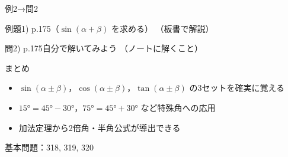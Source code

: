 \documentclass[aspectratio=43,professionalfonts,handout]{beamer}
\begin{document}
\begin{frame}{例2→問2}
  \begin{exampleblock}{例題1) p.175（$\sin(\alpha+\beta)$ を求める）}
    （板書で解説）
  \end{exampleblock}

  \vfill

  \begin{block}{問2) p.175\quad 自分で解いてみよう}
    （ノートに解くこと）
  \end{block}
\end{frame}

\begin{frame}{まとめ}
  \begin{itemize}
    \item $\sin(\alpha\pm\beta)$，$\cos(\alpha\pm\beta)$，$\tan(\alpha\pm\beta)$ の3セットを確実に覚える
    \item $15° = 45° - 30°$，$75° = 45° + 30°$ など特殊角への応用
    \item 加法定理から2倍角・半角公式が導出できる
  \end{itemize}

  \vfill
  {\small 基本問題：318, 319, 320}
\end{frame}
\end{document}
